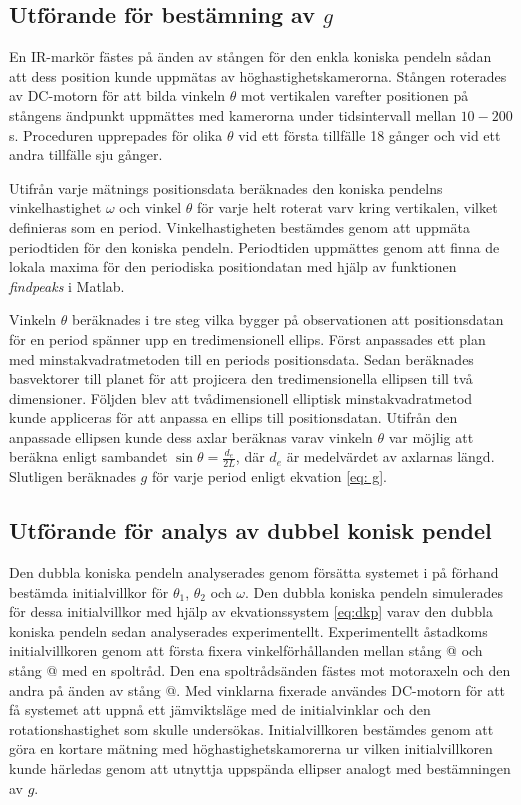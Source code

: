 \documentclass[12pt,a4paper]{article}
\makeatletter
\newcommand*{\rom}[1]{\expandafter\@slowromancap\romannumeral #1@}
\makeatother
\begin{document}
\subsection{Utförande för bestämning av $g$}
En IR-markör fästes på änden av stången för den enkla koniska pendeln sådan att dess position kunde uppmätas av höghastighetskamerorna. Stången roterades av DC-motorn för att bilda vinkeln $\theta$ mot vertikalen varefter positionen på stångens ändpunkt uppmättes med kamerorna under tidsintervall mellan $10-200$ s. Proceduren upprepades för olika $\theta$ vid ett första tillfälle 18 gånger och vid ett andra tillfälle sju gånger.

Utifrån varje mätnings positionsdata beräknades den koniska pendelns vinkelhastighet $\omega$ och vinkel $\theta$ för varje helt roterat varv kring vertikalen, vilket definieras som en period. Vinkelhastigheten bestämdes genom att uppmäta periodtiden för den koniska pendeln. Periodtiden uppmättes genom att finna de lokala maxima för den periodiska positiondatan med hjälp av funktionen \textit{findpeaks} i Matlab. 

Vinkeln $\theta$ beräknades i tre steg vilka bygger på observationen att positionsdatan för en period spänner upp en tredimensionell ellips. Först anpassades ett plan med minstakvadratmetoden till en periods positionsdata. Sedan beräknades basvektorer till planet för att projicera den tredimensionella ellipsen till två dimensioner. Följden blev att tvådimensionell elliptisk minstakvadratmetod kunde appliceras för att anpassa en ellips till positionsdatan. Utifrån den anpassade ellipsen kunde dess axlar beräknas varav vinkeln $\theta$ var möjlig att beräkna enligt sambandet $\sin \theta = \frac{d_e}{2L}$, där $d_e$ är medelvärdet av axlarnas längd. Slutligen beräknades $g$ för varje period enligt ekvation \eqref{eq: g}.

\subsection{Utförande för analys av dubbel konisk pendel}
Den dubbla koniska pendeln analyserades genom försätta systemet i på förhand bestämda initialvillkor för $\theta_1$, $\theta_2$ och $\omega$. Den dubbla koniska pendeln simulerades för dessa initialvillkor med hjälp av ekvationssystem \eqref{eq:dkp} varav den dubbla koniska pendeln sedan analyserades experimentellt. Experimentellt åstadkoms initialvillkoren genom att första fixera vinkelförhållanden mellan stång \rom{1} och stång \rom{2} med en spoltråd. Den ena spoltrådsänden fästes mot motoraxeln och den andra på änden av stång \rom{2}. Med vinklarna fixerade användes DC-motorn för att få systemet att uppnå ett jämviktsläge med de initialvinklar och den rotationshastighet som skulle undersökas. Initialvillkoren bestämdes genom att göra en kortare mätning med höghastighetskamorerna ur vilken initialvillkoren kunde härledas genom att utnyttja uppspända ellipser analogt med bestämningen av $g$. 
\end{document}
